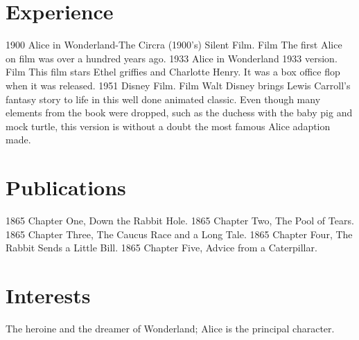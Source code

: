 \documentclass[letterpaper]{curriculum_vitae} %
\begin{document}
\section{Experience}
\begin{twenty}
    \twentyitem
    {1900}
    {Alice in Wonderland-The Circra (1900's) Silent Film.}
    {Film}
    {The first Alice on film was over a hundred years ago.}
    \twentyitem
    {1933}
    {Alice in Wonderland 1933 version.}
    {Film}
    {This film stars Ethel griffies and Charlotte Henry. It was a box office flop when it was released.}
    \twentyitem
    {1951}
    {Disney Film.}
    {Film}
    {Walt Disney brings Lewis Carroll's fantasy story to life in this well done animated classic. Even though many elements from the book were dropped, such as the duchess with the baby pig and mock turtle, this version is without a doubt the most famous Alice adaption made.}
\end{twenty}


\newpage

\makenextprofile

\section{Publications}
\begin{twentyshort}
  \twentyitemshort
    {1865}
    {Chapter One, Down the Rabbit Hole.}
  \twentyitemshort
    {1865}
    {Chapter Two, The Pool of Tears.}
  \twentyitemshort
    {1865}
    {Chapter Three,  The Caucus Race and a Long Tale.}
  \twentyitemshort
    {1865}
    {Chapter Four,  The Rabbit Sends a Little Bill.}
  \twentyitemshort
    {1865}
    {Chapter Five,  Advice from a Caterpillar.}
\end{twentyshort}

\section{Interests}
The heroine and the dreamer of Wonderland;  Alice is the principal character.
\end{document}
